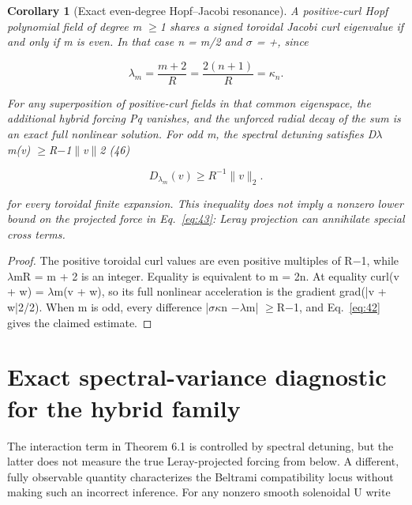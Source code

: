 \documentclass[10pt,letterpaper]{article}
\newtheorem{corollary}[theorem]{Corollary}
\theoremstyle{remark}
\begin{document}
\begin{corollary}[Exact even-degree Hopf–Jacobi resonance]

A positive-curl Hopf polynomial field of degree m \(\ge \)1 shares a signed toroidal Jacobi curl eigenvalue if and only if m is even. In that case n = m/2 and \(\sigma \) = +, since


\begin{equation}
\tag{45}\label{eq:45}
\lambda_m=\frac{m+2}R=\frac{2(n+1)}R=\kappa_n.
\end{equation}

For any superposition of positive-curl fields in that common eigenspace, the additional hybrid forcing Pq vanishes, and the unforced radial decay of the sum is an exact full nonlinear solution. For odd m, the spectral detuning satisfies D\(\lambda \)m(v) \(\ge \)R\(- \)1\(\| \)v\(\| \)2 (46)



\begin{equation}
\tag{46}\label{eq:46}
D_{\lambda_m}(v)\ge R^{-1}\|v\|_2.
\end{equation}

for every toroidal finite expansion. This inequality does not imply a nonzero lower bound on the projected force in Eq.~\eqref{eq:43}: Leray projection can annihilate special cross terms.


\end{corollary}

\begin{proof}
The positive toroidal curl values are even positive multiples of R\(- \)1, while \(\lambda \)mR = m + 2 is an integer. Equality is equivalent to m = 2n. At equality curl(v + w) = \(\lambda \)m(v + w), so its full nonlinear acceleration is the gradient grad(|v + w|2/2). When m is odd, every difference |\(\sigma \kappa \)n \(- \lambda \)m| \(\ge \)R\(- \)1, and Eq.~\eqref{eq:42} gives the claimed estimate.

\end{proof}

\section{Exact spectral-variance diagnostic for the hybrid family}

The interaction term in Theorem 6.1 is controlled by spectral detuning, but the latter does not measure the true Leray-projected forcing from below. A different, fully observable quantity characterizes the Beltrami compatibility locus without making such an incorrect inference. For any nonzero smooth solenoidal U write
\end{document}
